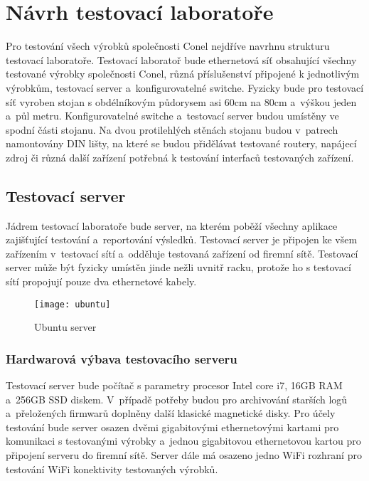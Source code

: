 \chapter{Návrh testovací laboratoře}
Pro testování všech výrobků společnosti Conel nejdříve navrhnu strukturu testovací laboratoře. Testovací laboratoř bude ethernetová síť obsahující všechny testované výrobky společnosti Conel, různá příslušenství připojené k jednotlivým výrobkům, testovací server a~konfigurovatelné switche. Fyzicky bude pro testovací síť vyroben stojan s obdélníkovým půdorysem asi 60cm na 80cm a~výškou jeden a~půl metru. Konfigurovatelné switche a~testovací server budou umístěny ve spodní části stojanu. Na dvou protilehlých stěnách stojanu budou v~patrech namontovány DIN lišty, na které se budou přidělávat testované routery, napájecí zdroj či různá další zařízení potřebná k testování interfaců testovaných zařízení.

\section{Testovací server}
Jádrem testovací laboratoře bude server, na kterém poběží všechny aplikace zajišťující testování a~reportování výsledků. Testovací server je připojen ke všem zařízením v~testovací sítí a~odděluje testovaná zařízení od firemní sítě. Testovací server může být fyzicky umístěn jinde nežli uvnitř racku, protože ho s testovací sítí propojují pouze dva ethernetové kabely.

\begin{figure}[h]
  \centering
  \texttt{[image: ubuntu]}
  \caption{Ubuntu server}
  \label{fig:ubuntu}
\end{figure}

\subsection{Hardwarová výbava testovacího serveru}
Testovací server bude počítač s parametry procesor Intel core i7, 16GB RAM a~256GB SSD diskem. V~případě potřeby budou pro archivování starších logů a~přeložených firmwarů doplněny další klasické magnetické disky. Pro účely testování bude server osazen dvěmi gigabitovými ethernetovými kartami pro komunikaci s testovanými výrobky a~jednou gigabitovou ethernetovou kartou pro připojení serveru do firemní sítě. Server dále má osazeno jedno WiFi rozhraní pro testování WiFi konektivity testovaných výrobků.

